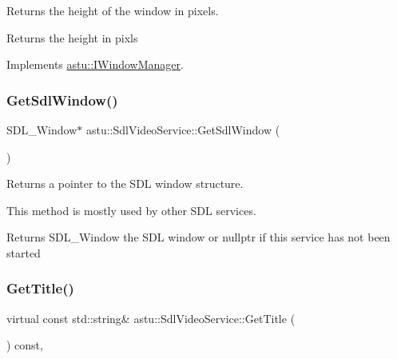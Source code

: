 Returns the height of the window in pixels.

\begin{DoxyReturn}{Returns}
the height in pixls 
\end{DoxyReturn}


Implements \hyperlink{classastu_1_1IWindowManager_a80a146779e21437e8c6ef78889389dfc}{astu\+::\+I\+Window\+Manager}.

\mbox{\label{classastu_1_1SdlVideoService_af0282450cc95c0cbc2a6add84603dd7a}} 
\subsubsection{\texorpdfstring{Get\+Sdl\+Window()}{GetSdlWindow()}}
{\footnotesize\ttfamily S\+D\+L\+\_\+\+Window$\ast$ astu\+::\+Sdl\+Video\+Service\+::\+Get\+Sdl\+Window (\begin{DoxyParamCaption}{ }\end{DoxyParamCaption})}

Returns a pointer to the S\+DL window structure.

This method is mostly used by other S\+DL services.

\begin{DoxyReturn}{Returns}
S\+D\+L\+\_\+\+Window the S\+DL window or {\ttfamily nullptr} if this service has not been started 
\end{DoxyReturn}
\mbox{\label{classastu_1_1SdlVideoService_ad6ee7f7a409960e91ddd77bbcea6432f}} 
\subsubsection{\texorpdfstring{Get\+Title()}{GetTitle()}}
{\footnotesize\ttfamily virtual const std\+::string\& astu\+::\+Sdl\+Video\+Service\+::\+Get\+Title (\begin{DoxyParamCaption}{ }\end{DoxyParamCaption}) const\hspace{0.3cm}{\ttfamily [override]}, {\ttfamily [virtual]}}

